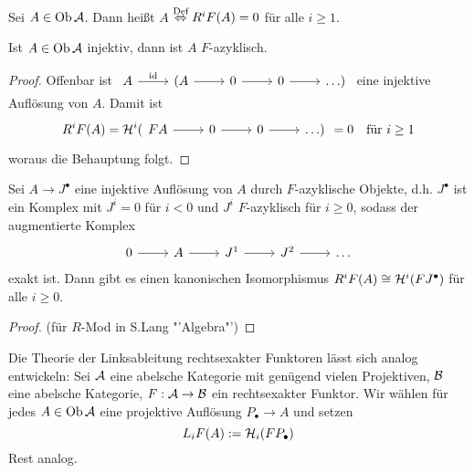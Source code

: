 \begin{df}\label{8.4}
	Sei $A\in \text{Ob}\,\mathcal{A}$. Dann heißt $A$  $\overset{\text{Def}}{\Leftrightarrow} R^iF(A) = 0$ für alle $i \geq 1$.
\end{df}
\begin{bem}\label{8.5}
	Ist $A\in \text{Ob}\,\mathcal{A}$ injektiv, dann ist $A$ $F$-azyklisch.
\end{bem}
\begin{proof}
	Offenbar ist $\begin{tikzcd}
	A \arrow{r}{\id} & (A \arrow{r} & 0 \arrow{r} & 0 \arrow{r} & \ldots)
	\end{tikzcd}$ eine injektive Auflösung von $A$. Damit ist 
	$$R^iF(A) = \HH^i(\begin{tikzcd}
	FA \arrow{r} & 0 \arrow{r} & 0\arrow{r} & \ldots)
	\end{tikzcd} =0 \quad \text{für }i\geq 1$$
	woraus die Behauptung folgt.
\end{proof}
\begin{sa}\label{8.6}
	Sei $A\to J^\bullet$ eine injektive Auflösung von $A$ durch $F$-azyklische Objekte, d.h. $J^\bullet$ ist ein Komplex mit $J^i=0$ für $i<0$ und $J^i$ $F$-azyklisch für $i\geq 0$, sodass der augmentierte Komplex $$\begin{tikzcd}
	0 \arrow{r} & A \arrow{r} & J^1 \arrow{r} & J^2 \arrow{r} & \ldots
	\end{tikzcd}$$
	exakt ist. Dann gibt es einen kanonischen Isomorphismus $R^iF(A) \cong \mathcal{H}^i(FJ^\bullet)$ für alle $i\geq 0$.
\end{sa}
\begin{proof}
	(für $R$-Mod in S.Lang "'Algebra"')
\end{proof}
\begin{anm}
	Die Theorie der Linksableitung rechtsexakter Funktoren lässt sich analog entwickeln: Sei $\mathcal{A}$ eine abelsche Kategorie mit genügend vielen Projektiven, $\mathcal{B}$ eine abelsche Kategorie, $F:\mathcal{A}\to \mathcal{B}$ ein rechtsexakter Funktor. Wir wählen für jedes $A\in \text{Ob}\,\mathcal{A}$ eine projektive Auflösung $P_\bullet \to A$ und setzen 
	$$L_iF(A):= \mathcal{H}_i(FP_\bullet)$$
	Rest analog.
\end{anm}
\newpage

